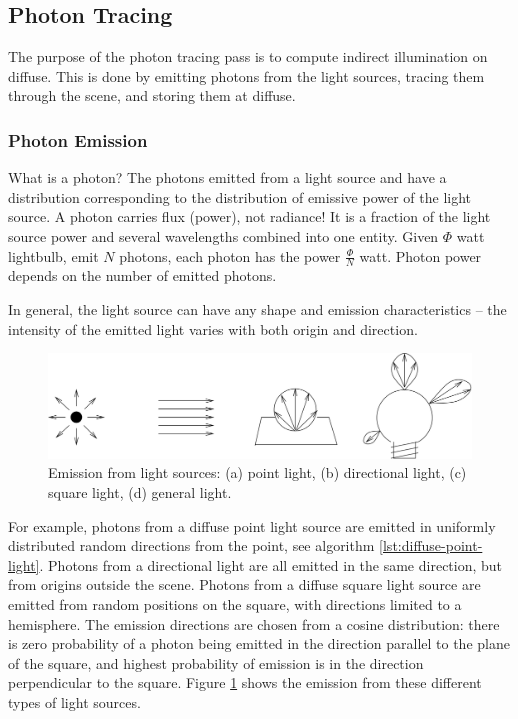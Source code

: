\subsection{Photon Tracing}
The purpose of the photon tracing pass is to compute indirect illumination on diffuse. This is done by emitting photons from the light sources, tracing them through the scene, and storing them at diffuse.


\subsubsection{Photon Emission}
What is a photon? The photons emitted from a light source and have a distribution corresponding to the distribution of emissive power of the light source. A photon carries flux (power), not radiance! It is a fraction of the light source power and several wavelengths combined into one entity. Given $\Phi$ watt lightbulb, emit $N$ photons, each photon has the power $\frac{\Phi}{N}$ watt. Photon power depends on the number of emitted photons.

In general, the light source can have any shape and emission characteristics -- the intensity of the emitted light varies with both origin and direction. 

\begin{figure}\label{f:photon-emission}
	\includegraphics[width=1.0\textwidth]{graphics/pm/pm-3}
	\caption{Emission from light sources: (a) point light, (b) directional light, (c) square light, (d) general light.}
\end{figure}

For example, photons from a diffuse point light source are emitted in uniformly distributed random directions from the point, see algorithm \ref{lst:diffuse-point-light}. Photons from a directional light are all emitted in the same direction, but from origins outside the scene. Photons from a diffuse square light source are emitted from random positions on the square, with directions limited to a hemisphere. The emission directions are chosen from a cosine distribution: there is zero probability of a photon being emitted in the direction parallel to the plane of the square, and highest probability of emission is in the direction perpendicular to the square. Figure \ref{f:photon-emission} shows the emission from these different types of light sources.

